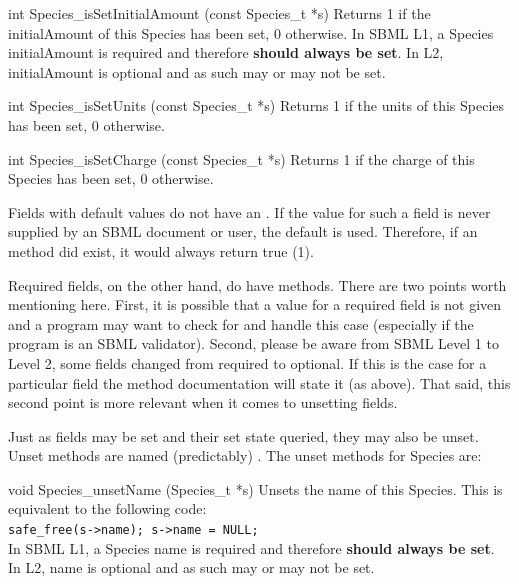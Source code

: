 \documentclass{cekmanual}
\begin{document}
\begin{methoddef}{int Species\_isSetInitialAmount (const Species\_t *s)}
  Returns 1 if the initialAmount of this Species has been set, 0
  otherwise.  In SBML L1, a Species initialAmount is required and
  therefore \textbf{should always be set}.  In L2, initialAmount is
  optional and as such may or may not be set.
\end{methoddef}

\begin{methoddef}{int Species\_isSetUnits (const Species\_t *s)}
  Returns 1 if the units of this Species has been set, 0 otherwise.
\end{methoddef}

\begin{methoddef}{int Species\_isSetCharge (const Species\_t *s)}
  Returns 1 if the charge of this Species has been set, 0 otherwise.
\end{methoddef}


Fields with default values do not have an .  If the
value for such a field is never supplied by an SBML document or user,
the default is used. Therefore, if an  method did
exist, it would always return true (1).

Required fields, on the other hand, do have 
methods.  There are two points worth mentioning here.  First, it is
possible that a value for a required field is not given and a program
may want to check for and handle this case (especially if the program
is an SBML validator).  Second, please be aware from SBML Level 1 to
Level 2, some fields changed from required to optional.  If this is
the case for a particular field the method documentation will state it
(as above).  That said, this second point is more relevant when it
comes to unsetting fields.

Just as fields may be set and their set state queried, they may also
be unset.  Unset methods are named (predictably)
.  The unset methods for Species are:

\begin{methoddef}{void Species\_unsetName (Species\_t *s)}
  Unsets the name of this Species.  This is equivalent to the following code:\\
  \texttt{safe\_free(s->name); s->name = NULL;}
  \\
  In SBML L1, a Species name is required and therefore \textbf{should
  always be set}.  In L2, name is optional and as such may or may not
  be set.
\end{methoddef}
\end{document}
